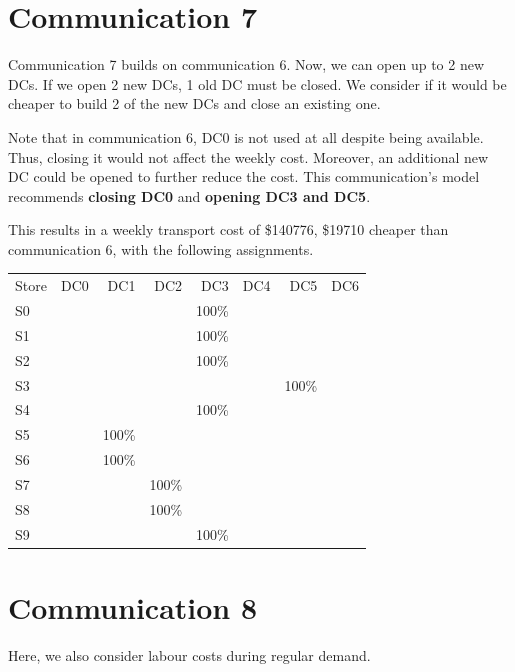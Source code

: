 \documentclass[11pt,a4paper]{article}
\begin{document}
\section{Communication 7}
Communication 7 builds on communication 6. Now, we can open up to 2 new DCs. 
If we open 2 new DCs, 1 old DC must be closed.
We consider if it would be cheaper
to build 2 of the new DCs and close an existing one.\@  

Note that in communication 6, DC0 is not used at all despite being available. 
Thus, closing it would not affect the weekly cost. Moreover, 
an additional new DC could be opened to further reduce the cost. This 
communication's model recommends \textbf{closing DC0} and 
\textbf{opening DC3 and DC5}. 

This results in a weekly transport cost of \$140776, \$19710 cheaper  than communication 
6, with the following assignments.\\[1em]
\begin{tabular}{l  r  r  r  r r r r}
    Store & DC0 & DC1 & DC2 & DC3 & DC4 & DC5 & DC6 \\
    S0 &  &  &  & 100\% &  &  &  \\
    S1 &  &  &  & 100\% &  &  &  \\
    S2 &  &  &  & 100\% &  &  &  \\
    S3 &  &  &  &  &  & 100\% &  \\
    S4 &  &  &  & 100\% &  &  &  \\
    S5 &  & 100\% &  &  &  &  &  \\
    S6 &  & 100\% &  &  &  &  &  \\
    S7 &  &  & 100\% &  &  &  &  \\
    S8 &  &  & 100\% &  &  &  &  \\
    S9 &  &  &  & 100\% &  &  &  \\
\end{tabular}

\newpage

\section{Communication 8}
Here, we also consider labour costs during regular demand.
\end{document}

